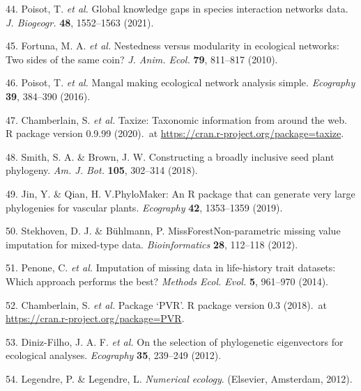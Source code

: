 \documentclass[
  12pt,
  a4paper,
]{article}
\begin{document}
\leavevmode\hypertarget{ref-poisot2021}{}%
44. Poisot, T. \emph{et al.} Global knowledge gaps in species interaction networks data. \emph{J. Biogeogr.} \textbf{48}, 1552--1563 (2021).

\leavevmode\hypertarget{ref-fortuna2010}{}%
45. Fortuna, M. A. \emph{et al.} Nestedness versus modularity in ecological networks: Two sides of the same coin? \emph{J. Anim. Ecol.} \textbf{79}, 811--817 (2010).

\leavevmode\hypertarget{ref-poisot2016}{}%
46. Poisot, T. \emph{et al.} Mangal making ecological network analysis simple. \emph{Ecography} \textbf{39}, 384--390 (2016).

\leavevmode\hypertarget{ref-chamberlain2020}{}%
47. Chamberlain, S. \emph{et al.} Taxize: Taxonomic information from around the web. R package version 0.9.99 (2020).~at \href{https://CRAN.R-project.org/package=taxize}{https://cran.r-project.org/package=taxize}.

\leavevmode\hypertarget{ref-smith2018}{}%
48. Smith, S. A. \& Brown, J. W. Constructing a broadly inclusive seed plant phylogeny. \emph{Am. J. Bot.} \textbf{105}, 302--314 (2018).

\leavevmode\hypertarget{ref-jin2019}{}%
49. Jin, Y. \& Qian, H. V.PhyloMaker: An R package that can generate very large phylogenies for vascular plants. \emph{Ecography} \textbf{42}, 1353--1359 (2019).

\leavevmode\hypertarget{ref-stekhoven2012}{}%
50. Stekhoven, D. J. \& Bühlmann, P. MissForestNon-parametric missing value imputation for mixed-type data. \emph{Bioinformatics} \textbf{28}, 112--118 (2012).

\leavevmode\hypertarget{ref-penone2014}{}%
51. Penone, C. \emph{et al.} Imputation of missing data in life-history trait datasets: Which approach performs the best? \emph{Methods Ecol. Evol.} \textbf{5}, 961--970 (2014).

\leavevmode\hypertarget{ref-santos2018}{}%
52. Chamberlain, S. \emph{et al.} Package `PVR'. R package version 0.3 (2018).~at \href{https://CRAN.R-project.org/package=PVR}{https://cran.r-project.org/package=PVR}.

\leavevmode\hypertarget{ref-diniz-filho2012}{}%
53. Diniz-Filho, J. A. F. \emph{et al.} On the selection of phylogenetic eigenvectors for ecological analyses. \emph{Ecography} \textbf{35}, 239--249 (2012).

\leavevmode\hypertarget{ref-legendre2012}{}%
54. Legendre, P. \& Legendre, L. \emph{Numerical ecology}. (Elsevier, Amsterdam, 2012).
\end{document}
